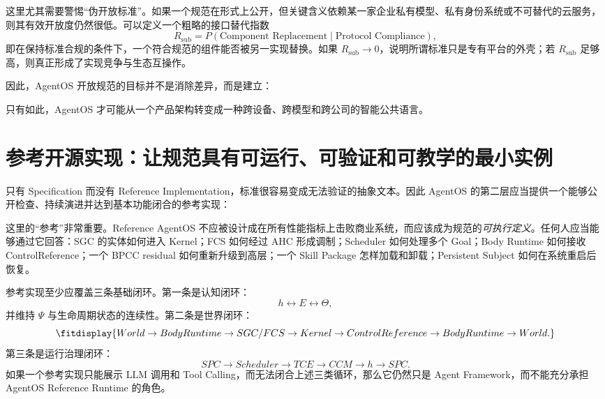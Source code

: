 这里尤其需要警惕``伪开放标准''。如果一个规范在形式上公开，但关键含义依赖某一家企业私有模型、私有身份系统或不可替代的云服务，则其有效开放度仍然很低。可以定义一个粗略的接口替代指数
\[
R_{\mathrm{sub}}
=
P(
\text{Component Replacement}
\mid
\text{Protocol Compliance}
),
\]
即在保持标准合规的条件下，一个符合规范的组件能否被另一实现替换。如果 $R_{\mathrm{sub}}\rightarrow 0$，说明所谓标准只是专有平台的外壳；若 $R_{\mathrm{sub}}$ 足够高，则真正形成了实现竞争与生态互操作。

因此，AgentOS 开放规范的目标并不是消除差异，而是建立：
\begin{statementbox}
\centering
{}
\end{statementbox}
只有如此，AgentOS 才可能从一个产品架构转变成一种跨设备、跨模型和跨公司的智能公共语言。

\section{参考开源实现：让规范具有可运行、可验证和可教学的最小实例}

只有 Specification 而没有 Reference Implementation，标准很容易变成无法验证的抽象文本。因此 AgentOS 的第二层应当提供一个能够公开检查、持续演进并达到基本功能闭合的参考实现：
\begin{statementbox}
\centering
{}
\end{statementbox}
这里的``参考''非常重要。Reference AgentOS 不应被设计成在所有性能指标上击败商业系统，而应该成为规范的\emph{可执行定义}。任何人应当能够通过它回答：SGC 的实体如何进入 Kernel；FCS 如何经过 AHC 形成调制；Scheduler 如何处理多个 Goal；Body Runtime 如何接收 ControlReference；一个 BPCC residual 如何重新升级到高层；一个 Skill Package 怎样加载和卸载；Persistent Subject 如何在系统重启后恢复。

参考实现至少应覆盖三条基础闭环。第一条是认知闭环：
\[
h
\leftrightarrow
E
\leftrightarrow
\Theta,
\]
并维持 $\Psi$ 与生命周期状态的连续性。第二条是世界闭环：
\[
\fitdisplay{
World
\rightarrow
BodyRuntime
\rightarrow
SGC/FCS
\rightarrow
Kernel
\rightarrow
ControlReference
\rightarrow
BodyRuntime
\rightarrow
World.
}
\]
第三条是运行治理闭环：
\[
SPC
\rightarrow
Scheduler
\rightarrow
TCE
\rightarrow
CCM
\rightarrow
h
\rightarrow
SPC.
\]
如果一个参考实现只能展示 LLM 调用和 Tool Calling，而无法闭合上述三类循环，那么它仍然只是 Agent Framework，而不能充分承担 AgentOS Reference Runtime 的角色。

